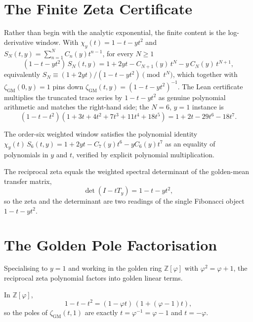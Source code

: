 \section{The Finite Zeta Certificate}
\label{sec:window6-ruelle-finite-certificate}

Rather than begin with the analytic exponential, the finite content is the log-derivative window. With $\chi_y(t)=1-t-yt^2$ and $S_N(t,y)=\sum_{n=1}^{N}C_n(y)t^{n-1}$, for every $N\ge1$
$$
(1-t-yt^2)\,S_N(t,y)=1+2yt-C_{N+1}(y)\,t^N-y\,C_N(y)\,t^{N+1},
$$
equivalently $S_N\equiv(1+2yt)/(1-t-yt^2)\pmod{t^N}$, which together with $\zeta_{\mathrm{GM}}(0,y)=1$ pins down $\zeta_{\mathrm{GM}}(t,y)=(1-t-yt^2)^{-1}$. The Lean certificate multiplies the truncated trace series by $1-t-yt^2$ as genuine polynomial arithmetic and matches the right-hand side; the $N=6$, $y=1$ instance is
$$
(1-t-t^2)(1+3t+4t^2+7t^3+11t^4+18t^5)=1+2t-29t^6-18t^7.
$$

\begin{theorem}
\label{thm:window6-ruelle-finite-window}
The order-six weighted window satisfies the polynomial identity $\chi_y(t)\,S_6(t,y)=1+2yt-C_7(y)t^6-yC_6(y)t^7$ as an equality of polynomials in $y$ and $t$, verified by explicit polynomial multiplication.
\end{theorem}

\begin{theorem}
\label{thm:window6-ruelle-determinant}
The reciprocal zeta equals the weighted spectral determinant of the golden-mean transfer matrix,
$$
\det(I-tT_y)=1-t-yt^2,
$$
so the zeta and the determinant are two readings of the single Fibonacci object $1-t-yt^2$.
\end{theorem}

\section{The Golden Pole Factorisation}
\label{sec:window6-ruelle-golden-pole}

Specialising to $y=1$ and working in the golden ring $\mathbb Z[\varphi]$ with $\varphi^2=\varphi+1$, the reciprocal zeta polynomial factors into golden linear terms.

\begin{theorem}
\label{thm:window6-ruelle-pole-factorisation}
In $\mathbb Z[\varphi]$,
$$
1-t-t^2=(1-\varphi t)\,(1+(\varphi-1)t),
$$
so the poles of $\zeta_{\mathrm{GM}}(t,1)$ are exactly $t=\varphi^{-1}=\varphi-1$ and $t=-\varphi$.
\end{theorem}

